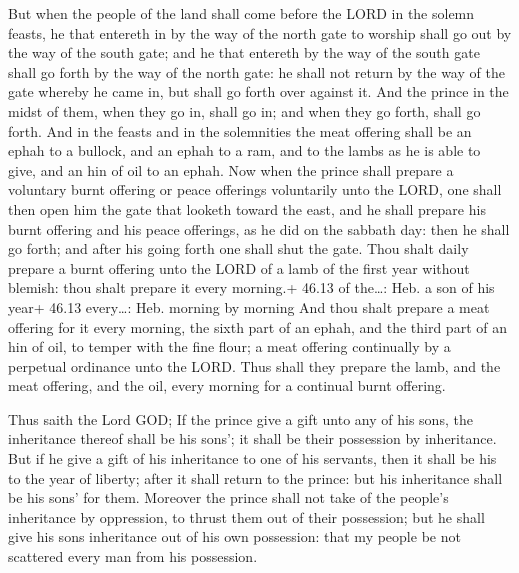  But when the people of the land shall come before the
LORD in the solemn feasts, he that entereth in by the way of the north
gate to worship shall go out by the way of the south gate; and he that
entereth by the way of the south gate shall go forth by the way of the
north gate: he shall not return by the way of the gate whereby he came
in, but shall go forth over against it.  And the prince in
the midst of them, when they go in, shall go in; and when they go forth,
shall go forth.  And in the feasts and in the solemnities
the meat offering shall be an ephah to a bullock, and an ephah to a ram,
and to the lambs as he is able to give, and an hin of oil to an ephah.
 Now when the prince shall prepare a voluntary burnt
offering or peace offerings voluntarily unto the LORD, one shall then
open him the gate that looketh toward the east, and he shall prepare his
burnt offering and his peace offerings, as he did on the sabbath day:
then he shall go forth; and after his going forth one shall shut the
gate.  Thou shalt daily prepare a burnt offering unto the
LORD of a lamb of the first year without blemish: thou shalt prepare it
every morning.+ 46.13 of the\ldots: Heb. a son of his year+ 46.13
every\ldots: Heb. morning by morning  And thou shalt
prepare a meat offering for it every morning, the sixth part of an
ephah, and the third part of an hin of oil, to temper with the fine
flour; a meat offering continually by a perpetual ordinance unto the
LORD.  Thus shall they prepare the lamb, and the meat
offering, and the oil, every morning for a continual burnt offering.

 Thus saith the Lord GOD; If the prince give a gift unto
any of his sons, the inheritance thereof shall be his sons'; it shall be
their possession by inheritance.  But if he give a gift of
his inheritance to one of his servants, then it shall be his to the year
of liberty; after it shall return to the prince: but his inheritance
shall be his sons' for them.  Moreover the prince shall not
take of the people's inheritance by oppression, to thrust them out of
their possession; but he shall give his sons inheritance out of his own
possession: that my people be not scattered every man from his
possession.

